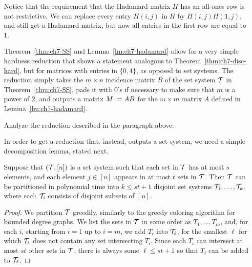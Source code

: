 Notice that the requirement that the Hadamard matrix $H$ has an all-ones
row is not restrictive. We can replace every entry $H(i,j)$ in $H$ by
$H(i,j)H(1,j)$, and still get a Hadamard matrix, but now all entries
in the first row are equal to $1$. 

Theorem~\ref{thm:ch7-SS} and Lemma~\ref{lm:ch7-hadamard} allow for a
very simple hardness reduction that shows a statement analogous to
Theorem~\ref{thm:ch7-disc-hard}, but for matrices with entries in
$\{0,4\}$, as opposed to set systems. The reduction simply takes the
$m\times n$ incidence matrix $B$ of the set system $\mathcal{T}$ in
Theorem~\ref{thm:ch7-SS}, pads it with $0$'s if necessary to make sure
that $m$ is a power of $2$, and outputs a matrix $M := A B$ for
the $m\times m$ matrix $A$ defined in Lemma~\ref{lm:ch7-hadamard}.

\begin{exercise}
  Analyze the reduction described in the paragraph above.
\end{exercise}

In order to get a reduction that, instead, outputs a set
system, we need a simple decomposition lemma, stated next. 

\begin{lemma}\label{lm:ch7-partition}
  Suppose that $(\mathcal{T}, [n])$ is a set system such that each set in $\mathcal{T}$
  has at most $s$ elements, and each element $j \in [n]$
  appears in at most $t$ sets in $\mathcal{T}$. Then $\mathcal{T}$ can be partitioned
  in polynomial time
  into $k \le st+1$ disjoint set systems $\mathcal{T}_1, \ldots, \mathcal{T}_k$, where
  each $\mathcal{T}_i$ consists of disjoint subsets of $[n]$.
\end{lemma}
\begin{proof}
  We partition $\mathcal{T}$ greedily, similarly to the greedy coloring
  algorithm for bounded degree graphs. We list the sets in $\mathcal{T}$ in some
  order as $T_1, \ldots, T_m$, and, for each $i$, starting
  from $i=1$ up to $i=m$, we add $T_i$ into $\mathcal{T}_\ell$, for the smallest $\ell$
  for which $\mathcal{T}_\ell$ does not contain any set intersecting
  $T_i$. Since each $T_i$ can intersect at most $st$ other sets in
  $\mathcal{T}$, there is always some $\ell \le st+1$ so that $T_i$ can
  be added to $\mathcal{T}_\ell$.
\end{proof}

